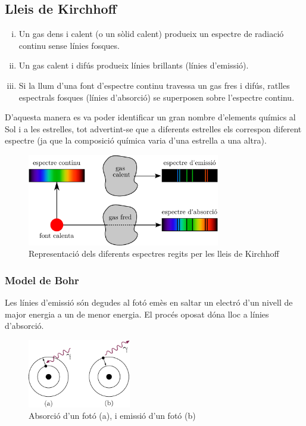 \subsection{Lleis de Kirchhoff}
\begin{enumerate}[(i)]
	\item Un gas dens i calent (o un sòlid calent) produeix un espectre de radiació continu sense línies fosques.
	\item Un gas calent i difús produeix línies brillants (línies d'emissió).
	\item Si la llum d'una font d'espectre continu travessa un gas fres i difús, ratlles espectrals fosques (línies d'absorció) se superposen sobre l'espectre continu.
\end{enumerate}
D'aquesta manera es va poder identificar un gran nombre d'elements químics al Sol i a les estrelles, tot advertint-se que a diferents estrelles els correspon diferent espectre (ja que la composició química varia d'una estrella a una altra).
\begin{figure}[H]
	\centering
	\includegraphics[width=0.75\textwidth]{./images/3-kirchhoff}
	\caption{Representació dels diferents espectres regits per les lleis de Kirchhoff}
	\label{fig:kirchhoff}
\end{figure}

\subsubsection*{Model de Bohr}
Les línies d'emissió són degudes al fotó emès en saltar un electró d'un nivell de major energia a un de menor energia. El procés oposat dóna lloc a línies d'absorció.
\begin{figure}[h]
	\centering
	\includegraphics[width=0.4\textwidth]{./images/3-photon-abs-em}
	\caption{Absorció d'un fotó (a), i emissió d'un fotó (b)}
	\label{fig:photon-abs-em}
\end{figure}

